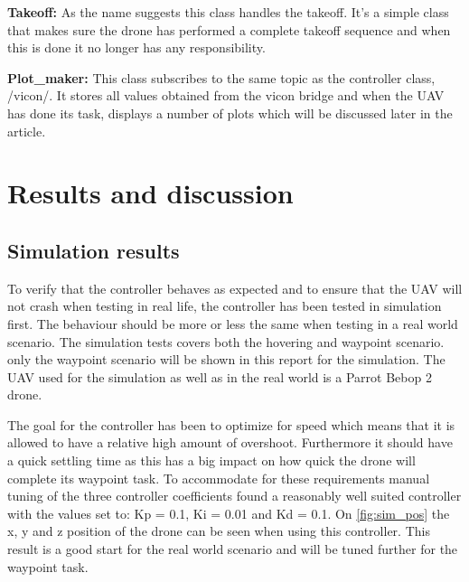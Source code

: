\documentclass[conference]{IEEEtran}
\begin{document}
\textbf{Takeoff:} As the name suggests this class handles the takeoff. It's a simple class that makes sure the drone has performed a complete takeoff sequence and when this is done it no longer has any responsibility. 

\textbf{Plot\_maker:} This class subscribes to the same topic as the controller class, /vicon/. It stores all values obtained from the vicon bridge and when the UAV has done its task, displays a number of plots which will be discussed later in the article. 


\section{Results and discussion}


\subsection{Simulation results}
To verify that the controller behaves as expected and to ensure that the UAV will not crash when testing in real life, the controller has been tested in simulation first. The behaviour should be more or less the same when testing in a real world scenario. The simulation tests covers both the hovering and waypoint scenario. only the waypoint scenario will be shown in this report for the simulation. The UAV used for the simulation as well as in the real world is a Parrot Bebop 2 drone.

The goal for the controller has been to optimize for speed which means that it is allowed to have a relative high amount of overshoot. Furthermore it should have a quick settling time as this has a big impact on how quick the drone will complete its waypoint task. To accommodate for these requirements manual tuning of the three controller coefficients found a reasonably well suited controller with the values set to: Kp = 0.1, Ki = 0.01 and Kd = 0.1. On \cref{fig:sim_pos} the x, y and z position of the drone can be seen when using this controller. This result is a good start for the real world scenario and will be tuned further for the waypoint task.
\end{document}
